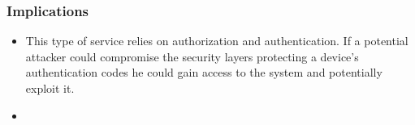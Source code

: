 	\subsubsection{Implications}
	\begin{itemize}

		\item This type of service relies on authorization and authentication. If a potential attacker could compromise the security layers protecting a device's authentication codes he could gain access to the system and potentially exploit it.
	  	\item 
	\end{itemize}

